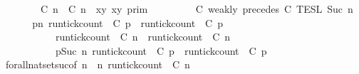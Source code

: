 \begin{isabellebody}
\isanewline
\ \ \ \ \ \ {\isasymlbrakk}\ {\isacharparenleft}{\isasymlceil}{\isacharhash}\isactrlsup {\isasymle}\ C\ n{\isacharcomma}\ {\isacharhash}\isactrlsup {\isasymle}\ C\ n{\isasymrceil}\ {\isasymin}\ {\isacharparenleft}{\isasymlambda}{\isacharparenleft}x{\isacharcomma}y{\isacharparenright}{\isachardot}\ x{\isasymle}y{\isacharparenright}{\isacharparenright}\ {\isasymrbrakk}\isactrlsub p\isactrlsub r\isactrlsub i\isactrlsub m\ \isanewline
\ \ \ \ \ \ {\isasyminter}\ {\isasymlbrakk}\ C\ weakly\ precedes\ C\ {\isasymrbrakk}\isactrlsub T\isactrlsub E\isactrlsub S\isactrlsub L\isactrlbsup {\isasymge}\ Suc\ n\isactrlesup {\isacartoucheclose}\isanewline
%
\isadelimproof
%
\endisadelimproof
%
\isatagproof
{}\isamarkupfalse%
\ {\isacharminus}\isanewline
\ \ \isamarkupfalse%
\ {\isacartoucheopen}{\isacharbraceleft}{\isasymrho}{\isachardot}\ {\isasymforall}p{\isasymge}n{\isachardot}\ {\isacharparenleft}run{\isacharunderscore}tick{\isacharunderscore}count\ {\isasymrho}\ C\ p{\isacharparenright}\ {\isasymle}\ {\isacharparenleft}run{\isacharunderscore}tick{\isacharunderscore}count\ {\isasymrho}\ C\ p{\isacharparenright}{\isacharbraceright}\isanewline
\ \ \ \ \ \ \ \ \ {\isacharequal}\ {\isacharbraceleft}{\isasymrho}{\isachardot}\ {\isacharparenleft}run{\isacharunderscore}tick{\isacharunderscore}count\ {\isasymrho}\ C\ n{\isacharparenright}\ {\isasymle}\ {\isacharparenleft}run{\isacharunderscore}tick{\isacharunderscore}count\ {\isasymrho}\ C\ n{\isacharparenright}{\isacharbraceright}\isanewline
\ \ \ \ \ \ \ \ \ {\isasyminter}\ {\isacharbraceleft}{\isasymrho}{\isachardot}\ {\isasymforall}p{\isasymge}Suc\ n{\isachardot}\ {\isacharparenleft}run{\isacharunderscore}tick{\isacharunderscore}count\ {\isasymrho}\ C\ p{\isacharparenright}\ {\isasymle}\ {\isacharparenleft}run{\isacharunderscore}tick{\isacharunderscore}count\ {\isasymrho}\ C\ p{\isacharparenright}{\isacharbraceright}{\isacartoucheclose}\isanewline
\ \ \ \ \isamarkupfalse%
\ forall{\isacharunderscore}nat{\isacharunderscore}set{\isacharunderscore}suc{\isacharbrackleft}of\ {\isacartoucheopen}n{\isacartoucheclose}\ {\isacartoucheopen}{\isasymlambda}{\isasymrho}\ n{\isachardot}\ {\isacharparenleft}run{\isacharunderscore}tick{\isacharunderscore}count\ {\isasymrho}\ C\ n{\isacharparenright}\isanewline

\end{isabellebody}

